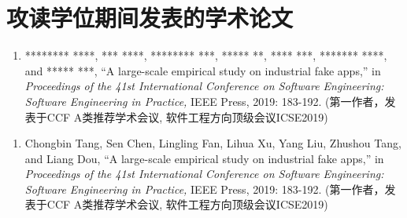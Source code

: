 \chapter*{攻读学位期间发表的学术论文}


\ifdefined \anonymous
	\begin{enumerate}
		\item ******** ****, *** ****, ******** ***, ***** **, **** ***, ******* ****, and ***** ***, ``A large-scale empirical study on industrial fake apps,'' in \textit{Proceedings of the 41st International Conference on Software Engineering: Software Engineering in Practice,} IEEE Press, 2019: 183-192. (第一作者，发表于CCF A类推荐学术会议, 软件工程方向顶级会议ICSE2019)
	\end{enumerate}
\else
	\begin{enumerate}
		\item Chongbin Tang, Sen Chen, Lingling Fan, Lihua Xu, Yang Liu, Zhushou Tang, and Liang Dou, ``A large-scale empirical study on industrial fake apps,'' in \textit{Proceedings of the 41st International Conference on Software Engineering: Software Engineering in Practice,} IEEE Press, 2019: 183-192. (第一作者，发表于CCF A类推荐学术会议, 软件工程方向顶级会议ICSE2019)
	\end{enumerate}
\fi

